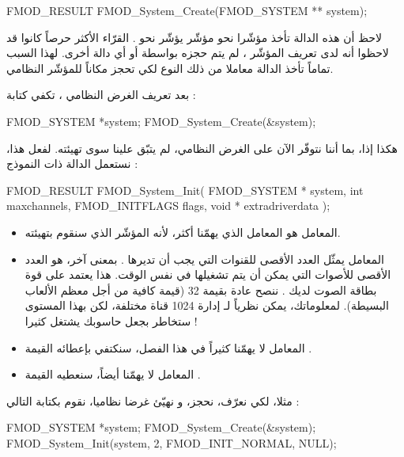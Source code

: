\begin{Csource}
FMOD_RESULT FMOD_System_Create(FMOD_SYSTEM ** system);
\end{Csource}

لاحظ أن هذه الدالة تأخذ مؤشّرا نحو مؤشّر يؤشّر نحو
.
القرّاء الأكثر حرصاً كانوا قد لاحظوا أنه لدى تعريف المؤشّر
،
لم يتم حجزه بواسطة
أو أي دالة أخرى. لهذا السبب تماماً تأخذ الدالة
معاملا من ذلك النوع لكي تحجز مكاناً للمؤشّر النظامي.

بعد تعريف الغرض النظامي ، تكفي كتابة :

\begin{Csource}
FMOD_SYSTEM *system;
FMOD_System_Create(&system);
\end{Csource}

هكذا إذا، بما أننا نتوفّر الآن على الغرض النظامي، لم يتبّق علينا سوى تهيئته. لفعل هذا، نستعمل الدالة
ذات النموذج :
\begin{Csource}
FMOD_RESULT FMOD_System_Init(
	FMOD_SYSTEM *  system,
	int  maxchannels,
	FMOD_INITFLAGS  flags,
	void *  extradriverdata
);
\end{Csource}

\begin{itemize}
	\item المعامل
	هو المعامل الذي يهمّنا أكثر، لأنه المؤشّر الذي سنقوم بتهيئته.
	\item المعامل
	يمثّل العدد الأقصى للقنوات التي يجب أن تديرها
	.
	بمعنى آخر، هو العدد الأقصى للأصوات التي يمكن أن يتم تشغيلها في نفس الوقت. هذا يعتمد على قوة بطاقة الصوت لديك . ننصح عادة بقيمة 32 (قيمة كافية من أجل معظم الألعاب البسيطة). لمعلوماتك، يمكن نظرياً لـ
	إدارة 1024 قناة مختلفة، لكن بهذا المستوى ستخاطر بجعل حاسوبك يشتغل كثيرا !
	\item المعامل
	لا يهمّنا كثيراً في هذا الفصل، سنكتفي بإعطائه القيمة
	.
	\item المعامل
	لا يهمّنا أيضاً، سنعطيه القيمة
	.
\end{itemize}

مثلا، لكي نعرّف، نحجز، و نهيّئ غرضا نظاميا،  نقوم بكتابة التالي :

\begin{Csource}
FMOD_SYSTEM *system;
FMOD_System_Create(&system);
FMOD_System_Init(system, 2, FMOD_INIT_NORMAL, NULL);
\end{Csource}

